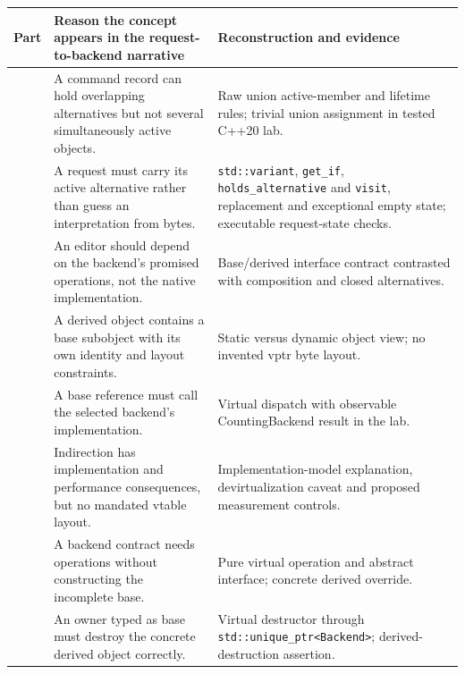 {\def\LTcaptype{none} %
\begin{longtable}[]{@{}
  >{\raggedright\arraybackslash}p{}
  >{\raggedright\arraybackslash}p{}
  >{\raggedright\arraybackslash}p{}@{}}
\toprule\noalign{}
\begin{minipage}[b]{\linewidth}\raggedright
Part
\end{minipage} & \begin{minipage}[b]{\linewidth}\raggedright
Reason the concept appears in the request-to-backend narrative
\end{minipage} & \begin{minipage}[b]{\linewidth}\raggedright
Reconstruction and evidence
\end{minipage} \\
\midrule\noalign{}
\endhead
\bottomrule\noalign{}
\endlastfoot
161 & A command record can hold overlapping alternatives but not several simultaneously active objects. & Raw union active-member and lifetime rules; trivial union assignment in tested C++20 lab. \\
162 & A request must carry its active alternative rather than guess an interpretation from bytes. & \texttt{std::variant}, \texttt{get\_if}, \texttt{holds\_alternative} and \texttt{visit}, replacement and exceptional empty state; executable request-state checks. \\
163 & An editor should depend on the backend's promised operations, not the native implementation. & Base/derived interface contract contrasted with composition and closed alternatives. \\
164 & A derived object contains a base subobject with its own identity and layout constraints. & Static versus dynamic object view; no invented vptr byte layout. \\
165 & A base reference must call the selected backend's implementation. & Virtual dispatch with observable CountingBackend result in the lab. \\
166 & Indirection has implementation and performance consequences, but no mandated vtable layout. & Implementation-model explanation, devirtualization caveat and proposed measurement controls. \\
167 & A backend contract needs operations without constructing the incomplete base. & Pure virtual operation and abstract interface; concrete derived override. \\
168 & An owner typed as base must destroy the concrete derived object correctly. & Virtual destructor through \texttt{std::unique\_ptr\textless{}Backend\textgreater{}}; derived-destruction assertion. \\

\end{longtable}}
